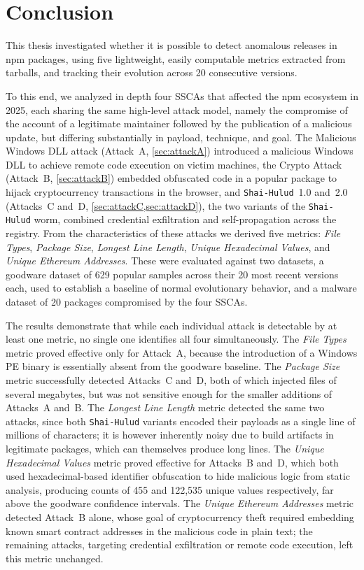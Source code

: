 \chapter{Conclusion}
\label{ch:conclusion}

This thesis investigated whether it is possible to detect anomalous releases in \ac{npm} packages, 
using five lightweight, easily computable metrics extracted from tarballs,
and tracking their evolution across 20 consecutive versions.

To this end, we analyzed in depth four \acp{SSCA} that affected the \ac{npm} ecosystem in 2025, 
each sharing the same high-level attack model, namely the compromise of the account of a legitimate maintainer
followed by the publication of a malicious update, but differing substantially in payload, technique, and goal.
The Malicious Windows \ac{DLL} attack (Attack~A, \cref{sec:attackA}) 
introduced a malicious Windows \ac{DLL} to achieve remote code execution on victim machines, 
the Crypto Attack (Attack~B, \cref{sec:attackB}) 
embedded obfuscated code in a popular package to hijack cryptocurrency transactions in the browser, 
and \texttt{Shai-Hulud}~1.0 and~2.0 (Attacks~C and~D, \cref{sec:attackC,sec:attackD}), 
the two variants of the \texttt{Shai-Hulud} worm, combined credential exfiltration and self-propagation across the registry.
From the characteristics of these attacks we derived five metrics:
\emph{File Types}, \emph{Package Size}, \emph{Longest Line Length},
\emph{Unique Hexadecimal Values}, and \emph{Unique Ethereum Addresses}.
These were evaluated against two datasets,
a goodware dataset of 629 popular samples across their 20 most recent versions each,
used to establish a baseline of normal evolutionary behavior,
and a malware dataset of 20 packages compromised by the four \acp{SSCA}.

The results demonstrate that while each individual attack is detectable by at least one metric,
no single one identifies all four simultaneously.
The \emph{File Types} metric proved effective only for Attack~A,
because the introduction of a Windows \ac{PE} binary is essentially absent from the goodware baseline.
The \emph{Package Size} metric successfully detected Attacks~C and~D, both of which injected files of several megabytes,
but was not sensitive enough for the smaller additions of Attacks~A and~B.
The \emph{Longest Line Length} metric detected the same two attacks,
since both \texttt{Shai-Hulud} variants encoded their payloads as a single line of millions of characters;
it is however inherently noisy due to build artifacts in legitimate packages, which can themselves produce long lines.
The \emph{Unique Hexadecimal Values} metric proved effective for Attacks~B and~D,
which both used hexadecimal-based identifier obfuscation to hide malicious logic from static analysis,
producing counts of 455 and 122,535 unique values respectively, far above the goodware confidence intervals.
The \emph{Unique Ethereum Addresses} metric detected Attack~B alone,
whose goal of cryptocurrency theft required embedding known smart contract addresses in the malicious code in plain text;
the remaining attacks, targeting credential exfiltration or remote code execution, left this metric unchanged.

